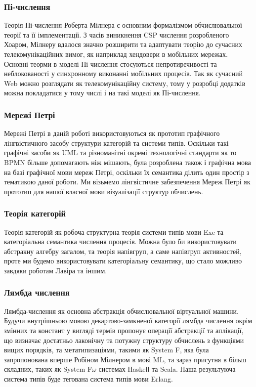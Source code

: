 \documentclass[11pt,oneside]{article}
\begin{document}
   \subsubsection*{Пі-числення}
   Теорія Пі-числення Роберта Мілнера є основним формалізмом обчислювальної
   теорії та її імплементації. З часів виникнення CSP числення розробленого Хоаром,
   Мілнеру вдалося значно розширити та адаптувати теорію до сучасних
   телекомунікаційних вимог, як наприклад хендовери в мобільних мережах.
   Основні теорми в моделі Пі-числення стосуються непротиречивості та неблокованості
   у синхронному виконанні мобільних процесів. Так як сучасний Web можно розглядати
   як телекомунікаційну систему, тому у розробці додатків можна покладатися у тому
   числі і на такі моделі як Пі-числення.

   \subsubsection*{Мережі Петрі}
   Мережі Петрі в даній роботі використовуються як прототип графічного
   лінгвістичного засобу структури категорій та системи типів. Оскільки
   такі графічні засоби як UML та різноманітні окремі технологічні
   стандарти як то BPMN більше допомагають ніж мішають, була розроблена
   також і графічна мова на базі графічної мови мереж Петрі, оскільки їх
   семантика ділить один простір з тематикою даної роботи. Ми візьмемо
   лінгвістичне забезпечення Мереж Петрі як прототип для нашої власної
   мови візуалізації структур обчислень.

\newpage
   \subsubsection*{Теорія категорій}
   Теорія категорій як робоча структурна теорія системи типів мови Exe та
   категоріальна семантика числення процесів. Можна було би використовувати абстракну алгебру загалом,
   та теорія напівгруп, а саме напівгруп активностей, проте ми будемо використовувати
   категоріальну семантику, що стало можливо завдяки роботам Лавіра та іншим.\\

   \subsubsection*{Лямбда числення}
   Лямбда-числення як основна абстракція обчислювальної віртуальної машини.
   Будучи внутрішньою мовою декартово-замкненої категорії лямбда числення окрім змінних
   та констант у вигляді термів пропонує операції абстракції та аплікації, що визначає
   достатньо лаконічну та потужну структуру обчислень з функціями вищих порядків,
   та метатипизаціями, такими як System F, яка була запропонована
   вперше Робіном Мілнером в мові ML, та зараз присутня в більш складних,
   таких як System F$\omega$ системах Haskell та Scala. Наша результуюча система
   типів буде тегована система типів мови Erlang.
\end{document}
